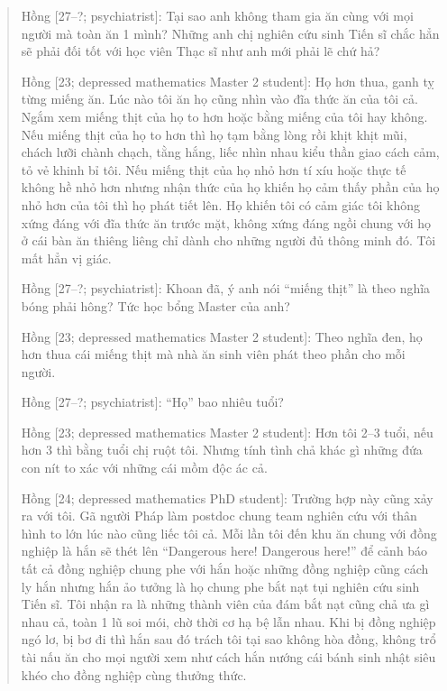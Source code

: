 \documentclass[12pt]{article}
\begin{document}
\begin{quote}
	{\sf Hồng [27--?; psychiatrist]}: Tại sao anh không tham gia ăn cùng với mọi người mà toàn ăn 1 mình? Những anh chị nghiên cứu sinh Tiến sĩ chắc hẳn sẽ phải đối tốt với học viên Thạc sĩ như anh mới phải lẽ chứ hả?
	
	{\sf Hồng [23; depressed mathematics Master 2 student]}: Họ hơn thua, ganh tỵ từng miếng ăn. Lúc nào tôi ăn họ cũng nhìn vào đĩa thức ăn của tôi cả. Ngắm xem miếng thịt của họ to hơn hoặc bằng miếng của tôi hay không. Nếu miếng thịt của họ to hơn thì họ tạm bằng lòng rồi khịt khịt mũi, chách lưỡi chành chạch, tằng hắng, liếc nhìn nhau kiểu thần giao cách cảm, tỏ vẻ khinh bỉ tôi. Nếu miếng thịt của họ nhỏ hơn tí xíu hoặc thực tế không hề nhỏ hơn nhưng nhận thức của họ khiến họ cảm thấy phần của họ nhỏ hơn của tôi thì họ phát tiết lên. Họ khiến tôi có cảm giác tôi không xứng đáng với đĩa thức ăn trước mặt, không xứng đáng ngồi chung với họ ở cái bàn ăn thiêng liêng chỉ dành cho những người đủ thông minh đó. Tôi mất hẳn vị giác.
	
	{\sf Hồng [27--?; psychiatrist]}: Khoan đã, ý anh nói ``miếng thịt'' là theo nghĩa bóng phải hông? Tức học bổng Master của anh?
	
	{\sf Hồng [23; depressed mathematics Master 2 student]}: Theo nghĩa đen, họ hơn thua cái miếng thịt mà nhà ăn sinh viên phát theo phần cho mỗi người.
	
	{\sf Hồng [27--?; psychiatrist]}: ``Họ'' bao nhiêu tuổi?
	
	{\sf Hồng [23; depressed mathematics Master 2 student]}: Hơn tôi 2--3 tuổi, nếu hơn 3 thì bằng tuổi chị ruột tôi. Nhưng tính tình chả khác gì những đứa con nít to xác với những cái mồm độc ác cả.
	
	{\sf Hồng [24; depressed mathematics PhD student]}: Trường hợp này cũng xảy ra với tôi. Gã người Pháp làm postdoc chung team nghiên cứu với thân hình to lớn lúc nào cũng liếc tôi cả. Mỗi lần tôi đến khu ăn chung với đồng nghiệp là hắn sẽ thét lên ``Dangerous here! Dangerous here!'' để cảnh báo tất cả đồng nghiệp chung phe với hắn hoặc những đồng nghiệp cũng cách ly hắn nhưng hắn ảo tưởng là họ chung phe bắt nạt tụi nghiên cứu sinh Tiến sĩ. Tôi nhận ra là những thành viên của đám bắt nạt cũng chả ưa gì nhau cả, toàn 1 lũ soi mói, chờ thời cơ hạ bệ lẫn nhau. Khi bị đồng nghiệp ngó lơ, bị bơ đi thì hắn sau đó trách tôi tại sao không hòa đồng, không trổ tài nấu ăn cho mọi người xem như cách hắn nướng cái bánh sinh nhật siêu khéo cho đồng nghiệp cùng thưởng thức.
	

\end{quote}
\end{document}
